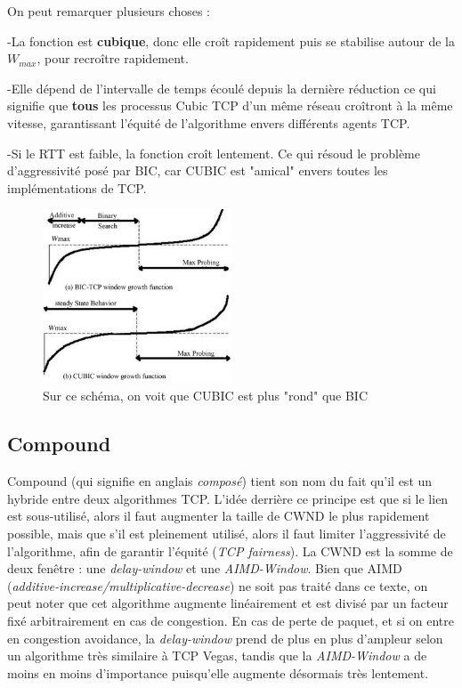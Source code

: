 \documentclass[	DIV=calc,%
							paper=a4,%
							fontsize=11pt,%
							twocolumn]{scrartcl}	 					%
\begin{document}
On peut remarquer plusieurs choses :

-La fonction est \textbf{cubique}, donc elle croît rapidement puis se stabilise autour de la $W_{max}$, pour recroître rapidement.

-Elle dépend de l'intervalle de temps écoulé depuis la dernière réduction ce qui signifie que \textbf{tous} les processus Cubic TCP d'un même réseau croîtront à la même vitesse, garantissant l'équité de l'algorithme envers différents agents TCP.

-Si le RTT est faible, la fonction croît lentement. Ce qui résoud le problème d'aggressivité posé par BIC, car CUBIC est "amical" envers toutes les implémentations de TCP.

\begin{figure}[h]
    \centering
    \includegraphics[width=0.5\textwidth]{Compound_vs_BIC}
    \caption{Sur ce schéma, on voit que CUBIC est plus "rond" que BIC \cite{Rhee05}}
    \label{fig:mesh1}
\end{figure}

\subsection*{Compound}
Compound (qui signifie en anglais \textit{composé}) tient son nom du fait qu'il est un hybride entre deux algorithmes TCP. L'idée derrière ce principe est que si le lien est sous-utilisé, alors il faut augmenter la taille de CWND le plus rapidement possible, mais que s'il est pleinement utilisé, alors il faut limiter l'aggressivité de l'algorithme, afin de garantir l'équité (\textit{TCP fairness}).
La CWND est la somme de deux fenêtre : une \textit{delay-window} et une \textit{AIMD-Window}. Bien que AIMD (\textit{additive-increase/multiplicative-decrease}) ne soit pas traité dans ce texte, on peut noter que cet algorithme augmente linéairement et est divisé par un facteur fixé arbitrairement en cas de congestion. En cas de perte de paquet, et si on entre en congestion avoidance, la \textit{delay-window} prend de plus en plus d'ampleur selon un algorithme très similaire à TCP Vegas, tandis que la \textit{AIMD-Window} a de moins en moins d'importance puisqu'elle augmente désormais très lentement.
\end{document}
